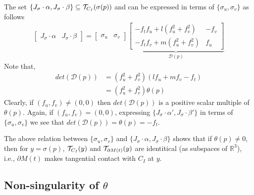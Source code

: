 \documentclass{elsart5p}
\begin{document}
The set $\{ J_{\sigma} \cdot \alpha , J_{\sigma} \cdot \beta \} \subseteq 
{\cal T}_{C_I}(\sigma(p))$ and can be expressed in terms of 
$\{ \sigma_u, \sigma_v \}$ as follows
\begin{align*}
\begin{bmatrix}
J_{\sigma} \cdot \alpha & J_{\sigma} \cdot \beta
\end{bmatrix}
= 
\begin{bmatrix}
\sigma_u & \sigma_v
\end{bmatrix}
\underbrace{
\begin{bmatrix}
-f_t f_u + l(f_u^2+f_v^2) & -f_v \\
-f_t f_v + m(f_u^2+f_v^2) & f_u
\end{bmatrix} }_{\mathcal{D}(p)}
\end{align*}
Note that,
\begin{align}
det(\mathcal{D}(p)) &= (f_u^2 + f_v^2)(l f_u + m f_v - f_t) 	\label{detDcase1Eq} \\
&=(f_u^2 +f_v^2 ) \theta (p)  \label{thetaDet}
\end{align}
Clearly, if $(f_u, f_v) \neq (0,0)$ then $det(\mathcal{D}(p))$ is a positive scalar multiple of $\theta(p)$.  
Again, if $(f_u, f_v) = (0,0)$, expressing $\{ J_{\sigma} \cdot \alpha', J_{\sigma}\cdot \beta' \}$ in terms of 
$\{ \sigma_u, \sigma_v \}$ we see that $det(\mathcal{D}(p)) = \theta(p) = -f_t$.  

The above relation between $\{ \sigma_u, \sigma_v \}$ and 
$\{ J_{\sigma} \cdot \alpha , J_{\sigma} \cdot \beta \}$ shows that 
if $\theta(p) \neq 0$, then for $y = \sigma(p)$, ${\cal T}_{C_I}(y)$ 
and ${\cal T}_{\partial M(t)}(y)$ are identitical 
(as subspaces of ${\mathbb R}^3$), i.e., 
$\partial M(t)$ makes tangential contact with $C_I$ at $y$.


\subsection{Non-singularity of $\theta$}  \label{thetaNonSingSec}
\end{document}
